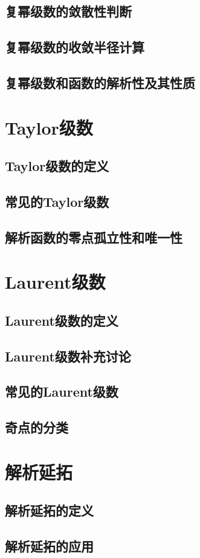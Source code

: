     \subsection{复幂级数的敛散性判断}

    \subsection{复幂级数的收敛半径计算}

    \subsection{复幂级数和函数的解析性及其性质}

\section{Taylor级数}
    \subsection{Taylor级数的定义}

    \subsection{常见的Taylor级数}

    \subsection{解析函数的零点孤立性和唯一性}

\section{Laurent级数}
    \subsection{Laurent级数的定义}

    \subsection{Laurent级数补充讨论}

    \subsection{常见的Laurent级数}

    \subsection{奇点的分类}


\section{解析延拓}

    \subsection{解析延拓的定义}

    \subsection{解析延拓的应用}
